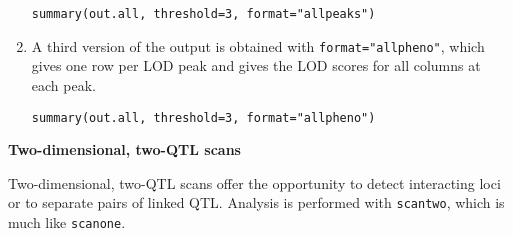 \documentclass[10pt,letterpaper]{article}
\newcommand{\usercolor}{\color [named]{BlueViolet}}
\begin{document}
\begin{enumerate}
\usercolor
\verb|summary(out.all, threshold=3, format="allpeaks")|
\normalcolor

\item A third version of the output is obtained with
  \verb-format="allpheno"-, which gives one row per LOD peak and gives
  the LOD scores for all columns at each peak.

\usercolor
\verb|summary(out.all, threshold=3, format="allpheno")|
\normalcolor

\end{enumerate}


\vspace{12pt}
\textbf{Two-dimensional, two-QTL scans} \vspace{6pt}
\nopagebreak

Two-dimensional, two-QTL scans offer the opportunity to detect
interacting loci or to separate pairs of linked QTL.  Analysis is
performed with \verb-scantwo-, which is much like \verb-scanone-.
\end{document}
